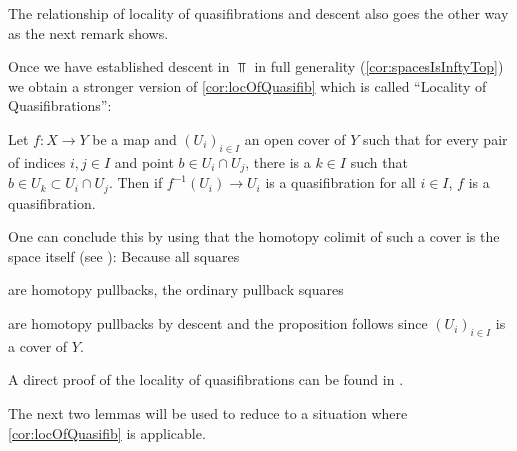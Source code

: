 The relationship of locality of quasifibrations and descent also goes the other way as the next remark shows.
\begin{remark}\label{rmk:locOfQuasifibDescent}
    Once we have established descent in $\Top$ in full generality (\cref{cor:spacesIsInftyTop}) we obtain a stronger version of \cref{cor:locOfQuasifib} which is called ``Locality of Quasifibrations'':
    
    Let $f\colon X\to Y$ be a map and $(U_i)_{i\in I}$ an open cover of $Y$ such that for every pair of indices $i,j\in I$ and point $b\in U_i\cap U_j$, there is a $k\in I$ such that $b\in U_k\subset U_i\cap U_j$.
    Then if $f^{-1}(U_i)\to U_i$ is a quasifibration for all $i\in I$, $f$ is a quasifibration.

    One can conclude this by using that the homotopy colimit of such a cover is the space itself (see \cite[Proposition 4.6 (c)]{hypercovers}):
    Because all squares
    \begin{center}
    \end{center}
    are homotopy pullbacks, the ordinary pullback squares 
    \begin{center}
    \end{center}
    are homotopy pullbacks by descent and the proposition follows since $(U_i)_{i\in I}$ is a cover of $Y$.

    A direct proof of the locality of quasifibrations can be found in \cite[Theorem A.1.2]{aguilar2002algebraic}.
\end{remark}
The next two lemmas will be used to reduce to a situation where \cref{cor:locOfQuasifib} is applicable.
